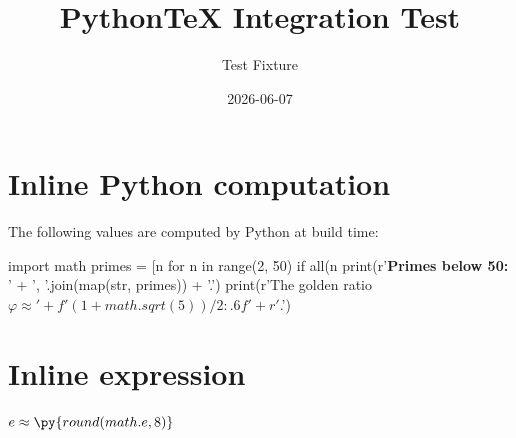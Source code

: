 \documentclass{article}
\title{PythonTeX Integration Test}
\author{Test Fixture}
\date{2026-06-07}
\begin{document}
\maketitle

\section{Inline Python computation}

The following values are computed by Python at build time:

\begin{pycode}
import math
primes = [n for n in range(2, 50) if all(n %
print(r'\textbf{Primes below 50:} ' + ', '.join(map(str, primes)) + '.')
print(r'The golden ratio $\varphi \approx ' + f'{(1 + math.sqrt(5)) / 2:.6f}' + r'$.')
\end{pycode}

\section{Inline expression}

$e \approx \py{round(math.e, 8)}$
\end{document}
